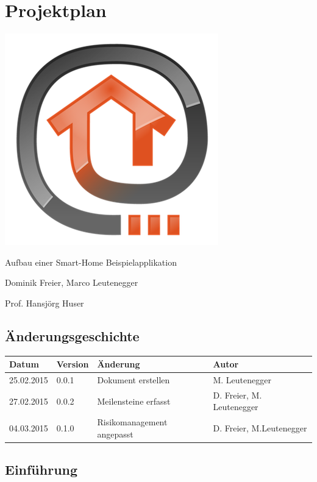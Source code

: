 \chapter{Projektplan}

\begin{center}
	\includegraphics[scale=0.75]{appendix/img/openhabLogo}
\end{center}
\vfill
\begin{description}[style=multiline,leftmargin=3cm]
\item[Thema] Aufbau einer Smart-Home Beispielapplikation
\item[Studenten] Dominik Freier, Marco Leutenegger
\item[Betreuer] Prof. Hansjörg Huser
\end{description}
\pagebreak

\section*{Änderungsgeschichte}
	\begin{tabularx}{\textwidth}{lllX}
	\textbf{Datum}		& \textbf{Version}	& \textbf{Änderung}	& \textbf{Autor} \\
	\hline
	25.02.2015			& 0.0.1				& Dokument erstellen & M. Leutenegger \\
	\hline
	27.02.2015			& 0.0.2				& Meilensteine erfasst	& D. Freier, M. Leutenegger \\
	\hline
	04.03.2015			& 0.1.0				& Risikomanagement angepasst & D. Freier, M.Leutenegger\\
	\hline
	\end{tabularx}
\pagebreak

\section*{Einführung}
